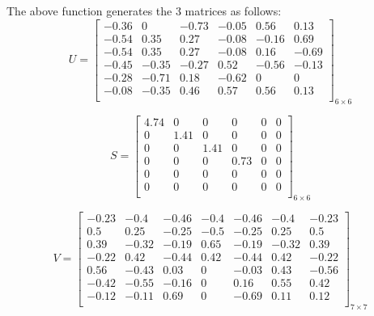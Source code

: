 \documentclass{article}
\begin{document}
The above function generates the 3 matrices as follows:
\begin{equation*}
    U = \begin{bmatrix}
        -0.36 & 0 & -0.73 & -0.05 & 0.56 & 0.13 \\
        -0.54 & 0.35 & 0.27 & -0.08 & -0.16 & 0.69 \\
        -0.54 & 0.35 & 0.27 & -0.08 & 0.16 & -0.69 \\
        -0.45 & -0.35 & -0.27 & 0.52 & -0.56 & -0.13 \\
        -0.28 & -0.71 & 0.18 & -0.62 & 0 & 0 \\
        -0.08 & -0.35 & 0.46 & 0.57 & 0.56 & 0.13 \\
    \end{bmatrix}_{6\times6}
\end{equation*}

\begin{equation*}
    S = \begin{bmatrix}
        4.74 & 0 & 0 & 0 & 0 & 0 \\
        0 & 1.41 & 0 & 0 & 0 & 0 \\
        0 & 0 & 1.41 & 0 & 0 & 0 \\
        0 & 0 & 0 & 0.73 & 0 & 0 \\
        0 & 0 & 0 & 0 & 0 & 0 \\
        0 & 0 & 0 & 0 & 0 & 0 \\
    \end{bmatrix}_{6\times6}
\end{equation*}

\begin{equation*}
    V = \begin{bmatrix}
        -0.23 & -0.4 & -0.46 & -0.4 & -0.46 & -0.4 & -0.23 \\
        0.5 & 0.25 & -0.25 & -0.5 & -0.25 & 0.25 & 0.5 \\
        0.39 & -0.32 & -0.19 & 0.65 & -0.19 & -0.32 & 0.39 \\
        -0.22 & 0.42 & -0.44 & 0.42 & -0.44 & 0.42 & -0.22 \\
        0.56 & -0.43 & 0.03 & 0 & -0.03 & 0.43 & -0.56 \\
        -0.42 & -0.55 & -0.16 & 0 & 0.16 & 0.55 & 0.42 \\
        -0.12 & -0.11 & 0.69 & 0 & -0.69 & 0.11 & 0.12 \\
    \end{bmatrix}_{7\times7}
\end{equation*}
\end{document}
